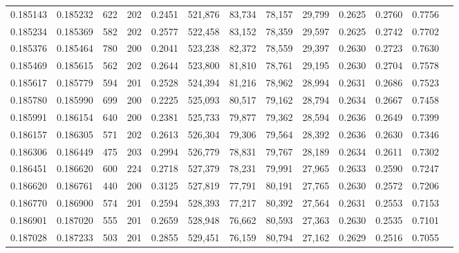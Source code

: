 \begin{tabular}{rrrrrrrrrrrrr}
0.185143 & 0.185232 &   622 & 202 &                                     0.2451 & 521,876 &  83,734 &  78,157 &  29,799 & 0.2625 & 0.2760 & 0.7756 \\
0.185234 & 0.185369 &   582 & 202 &                                     0.2577 & 522,458 &  83,152 &  78,359 &  29,597 & 0.2625 & 0.2742 & 0.7702 \\
0.185376 & 0.185464 &   780 & 200 &                                     0.2041 & 523,238 &  82,372 &  78,559 &  29,397 & 0.2630 & 0.2723 & 0.7630 \\
0.185469 & 0.185615 &   562 & 202 &                                     0.2644 & 523,800 &  81,810 &  78,761 &  29,195 & 0.2630 & 0.2704 & 0.7578 \\
0.185617 & 0.185779 &   594 & 201 &                                     0.2528 & 524,394 &  81,216 &  78,962 &  28,994 & 0.2631 & 0.2686 & 0.7523 \\
0.185780 & 0.185990 &   699 & 200 &                                     0.2225 & 525,093 &  80,517 &  79,162 &  28,794 & 0.2634 & 0.2667 & 0.7458 \\
0.185991 & 0.186154 &   640 & 200 &                                     0.2381 & 525,733 &  79,877 &  79,362 &  28,594 & 0.2636 & 0.2649 & 0.7399 \\
0.186157 & 0.186305 &   571 & 202 &                                     0.2613 & 526,304 &  79,306 &  79,564 &  28,392 & 0.2636 & 0.2630 & 0.7346 \\
0.186306 & 0.186449 &   475 & 203 &                                     0.2994 & 526,779 &  78,831 &  79,767 &  28,189 & 0.2634 & 0.2611 & 0.7302 \\
0.186451 & 0.186620 &   600 & 224 &                                     0.2718 & 527,379 &  78,231 &  79,991 &  27,965 & 0.2633 & 0.2590 & 0.7247 \\
0.186620 & 0.186761 &   440 & 200 &                                     0.3125 & 527,819 &  77,791 &  80,191 &  27,765 & 0.2630 & 0.2572 & 0.7206 \\
0.186770 & 0.186900 &   574 & 201 &                                     0.2594 & 528,393 &  77,217 &  80,392 &  27,564 & 0.2631 & 0.2553 & 0.7153 \\
0.186901 & 0.187020 &   555 & 201 &                                     0.2659 & 528,948 &  76,662 &  80,593 &  27,363 & 0.2630 & 0.2535 & 0.7101 \\
0.187028 & 0.187233 &   503 & 201 &                                     0.2855 & 529,451 &  76,159 &  80,794 &  27,162 & 0.2629 & 0.2516 & 0.7055 \\

\end{tabular}
